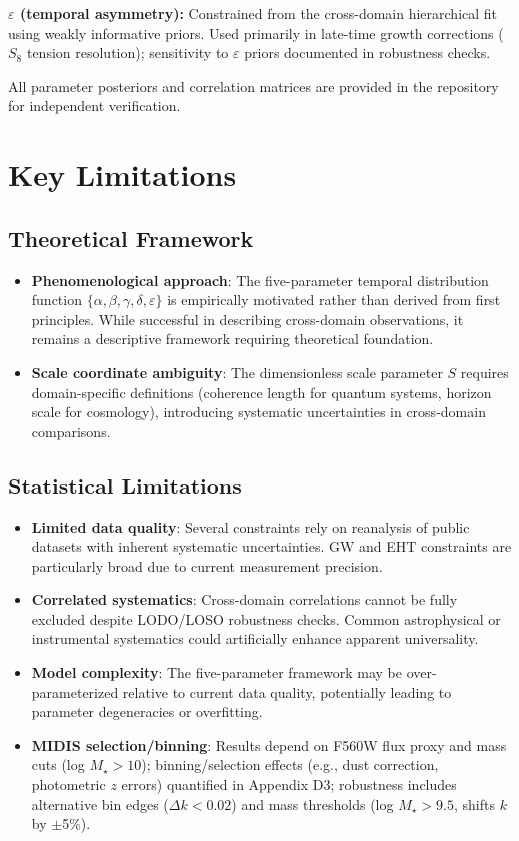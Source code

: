 \documentclass[aps,prd,preprint,onecolumn,nofootinbib,superscriptaddress,longbibliography]{revtex4-2}
\begin{document}
\textbf{$\varepsilon$ (temporal asymmetry):} Constrained from the cross-domain hierarchical fit using weakly informative priors. Used primarily in late-time growth corrections ($S_8$ tension resolution); sensitivity to $\varepsilon$ priors documented in robustness checks.

All parameter posteriors and correlation matrices are provided in the repository for independent verification.

\section{Key Limitations}
\label{sec:limitations}

\subsection{Theoretical Framework}
\begin{itemize}
\item \textbf{Phenomenological approach}: The five-parameter temporal distribution function $\{\alpha, \beta, \gamma, \delta, \varepsilon\}$ is empirically motivated rather than derived from first principles. While successful in describing cross-domain observations, it remains a descriptive framework requiring theoretical foundation.
\item \textbf{Scale coordinate ambiguity}: The dimensionless scale parameter $S$ requires domain-specific definitions (coherence length for quantum systems, horizon scale for cosmology), introducing systematic uncertainties in cross-domain comparisons.
\end{itemize}

\subsection{Statistical Limitations}
\begin{itemize}
\item \textbf{Limited data quality}: Several constraints rely on reanalysis of public datasets with inherent systematic uncertainties. GW and EHT constraints are particularly broad due to current measurement precision.
\item \textbf{Correlated systematics}: Cross-domain correlations cannot be fully excluded despite LODO/LOSO robustness checks. Common astrophysical or instrumental systematics could artificially enhance apparent universality.
\item \textbf{Model complexity}: The five-parameter framework may be over-parameterized relative to current data quality, potentially leading to parameter degeneracies or overfitting.
\item \textbf{MIDIS selection/binning}: Results depend on F560W flux proxy and mass cuts (log $M_\star > 10$); binning/selection effects (e.g., dust correction, photometric $z$ errors) quantified in Appendix D3; robustness includes alternative bin edges ($\Delta k < 0.02$) and mass thresholds (log $M_\star > 9.5$, shifts $k$ by $\pm$5\%).
\end{itemize}
\end{document}
